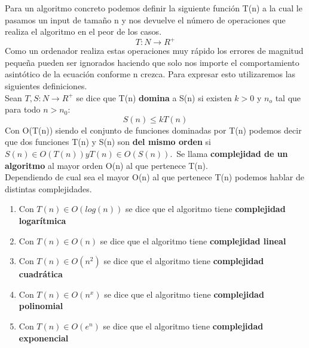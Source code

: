 \documentclass[12pt,a4paper]{article}
\begin{document}
		Para un algoritmo concreto podemos definir la siguiente función T(n) a la cual le pasamos un input de tamaño n y nos devuelve el número de operaciones que realiza el algoritmo en el peor de los casos.\\
		\[T: N \rightarrow R^+ \]
		Como un ordenador realiza estas operaciones muy rápido los errores de magnitud pequeña pueden ser ignorados haciendo que solo nos importe el comportamiento asintótico de la ecuación conforme n crezca. Para expresar esto utilizaremos las siguientes definiciones.\\
		Sean $T, S : N \rightarrow R^+$ se dice que T(n) \textbf{domina} a S(n) si existen $k > 0$ y $n_o$ tal que para todo $n>n_0$:\\
		\[S(n) \leq kT(n) \]
		Con O(T(n)) siendo el conjunto de funciones dominadas por T(n) podemos decir que dos funciones T(n) y S(n) son \textbf{del mismo orden} si $ S(n) \in O(T(n)) y T(n) \in O(S(n))$.\
		Se llama \textbf{complejidad de un algoritmo} al mayor orden O(n) al que pertenece T(n).\\ 
		Dependiendo de cual sea el mayor O(n) al que pertenece T(n) podemos hablar de distintas complejidades. 
			\begin{enumerate}
			\item Con $T(n) \in O(log(n))$ se dice que el algoritmo tiene \textbf{complejidad logarítmica}
			\item Con $T(n) \in O(n)$ se dice que el algoritmo tiene \textbf{complejidad lineal}
			\item Con $T(n) \in O(n^2)$ se dice que el algoritmo tiene \textbf{complejidad cuadrática}
			\item Con $T(n) \in O(n^x)$ se dice que el algoritmo tiene \textbf{complejidad polinomial}
			\item Con $T(n) \in O(e^n)$ se dice que el algoritmo tiene \textbf{complejidad exponencial}
			\end{enumerate}
		
\end{document}
